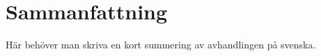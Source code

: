 \chapter*{Sammanfattning}

H\"ar beh\"over man skriva en kort summering av avhandlingen p\r{a} svenska.

